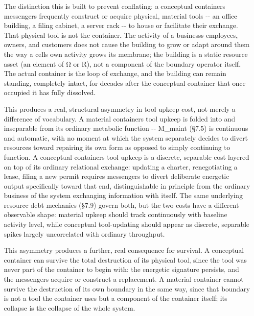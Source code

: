 \documentclass[
]{article}
\begin{document}
The distinction this is built to prevent conflating: a conceptual
containers messengers frequently construct or acquire physical, material
tools -\/- an office building, a filing cabinet, a server rack -\/- to
house or facilitate their exchange. That physical tool is not the
container. The activity of a businesss employees, owners, and customers
does not cause the building to grow or adapt around them the way a cells
own activity grows its membrane; the building is a static resource asset
(an element of Ω or R), not a component of the boundary operator itself.
The actual container is the loop of exchange, and the building can
remain standing, completely intact, for decades after the conceptual
container that once occupied it has fully dissolved.

This produces a real, structural asymmetry in tool-upkeep cost, not
merely a difference of vocabulary. A material containers tool upkeep is
folded into and inseparable from its ordinary metabolic function -\/-
M\_maint (§7.5) is continuous and automatic, with no moment at which the
system separately decides to divert resources toward repairing its own
form as opposed to simply continuing to function. A conceptual
containers tool upkeep is a discrete, separable cost layered on top of
its ordinary relational exchange: updating a charter, renegotiating a
lease, filing a new permit requires messengers to divert deliberate
energetic output specifically toward that end, distinguishable in
principle from the ordinary business of the system exchanging
information with itself. The same underlying resource debt mechanics
(§7.9) govern both, but the two costs have a different observable shape:
material upkeep should track continuously with baseline activity level,
while conceptual tool-updating should appear as discrete, separable
spikes largely uncorrelated with ordinary throughput.

This asymmetry produces a further, real consequence for survival. A
conceptual container can survive the total destruction of its physical
tool, since the tool was never part of the container to begin with: the
energetic signature persists, and the messengers acquire or construct a
replacement. A material container cannot survive the destruction of its
own boundary in the same way, since that boundary is not a tool the
container uses but a component of the container itself; its collapse is
the collapse of the whole system.
\end{document}
